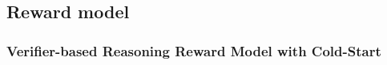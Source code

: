 

\subsection{Reward model}

\subsubsection{Verifier-based Reasoning Reward Model with Cold-Start}
\label{sec:cold_start_reward}

